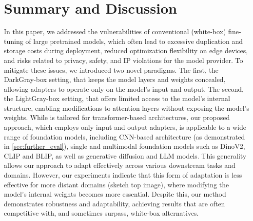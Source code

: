 \section{Summary and Discussion}
\label{sec:summary}
In this paper, we addressed the vulnerabilities of conventional (white-box) fine-tuning of large pretrained models, which often lead to excessive duplication and storage costs during deployment, reduced optimization flexibility on edge devices, and risks related to privacy, safety, and IP violations for the model provider. To mitigate these issues, we introduced two novel paradigms. The first, the DarkGray-box setting, that keeps the model layers and weights concealed, allowing adapters to operate only on the model's input and output. The second, the LightGray-box setting, that offers limited access to the model's internal structure, enabling modifications to attention layers without exposing the model's weights. While \oursp is tailored for transformer-based architectures, our proposed \ours approach, which employs only input and output adapters, is applicable to a wide range of foundation models, including CNN-based architecture (as demonstrated in \cref{sec:further_eval}), single and multimodal foundation models such as DinoV2, CLIP and BLIP, as well as generative diffusion and LLM models. This generality allows our approach to adapt effectively across various downstream tasks and domains. However, our experiments indicate that this form of adaptation is less effective for more distant domains (\eg sketch top image), where modifying the model's internal weights becomes more essential. Despite this, our method demonstrates robustness and adaptability, achieving results that are often competitive with, and sometimes surpass, white-box alternatives.
